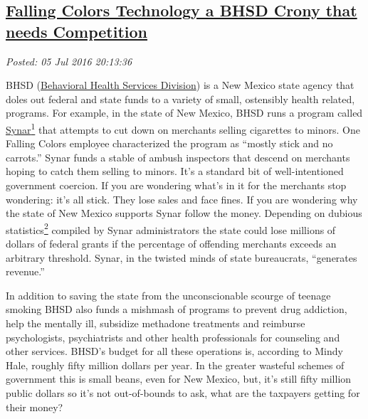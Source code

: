 

\subsection*{\href{http://analyzethedatanotthedrivel.org/2016/07/05/falling-colors-technology-a-bhsd-crony-that-needs-competition/}{Falling Colors Technology a BHSD Crony that needs Competition}}


\noindent\emph{Posted: 05 Jul 2016 20:13:36}
\vspace{6pt}

BHSD
(\href{http://www.hsd.state.nm.us/Behavioral_health_services_division.aspx}{Behavioral
Health Services Division}) is a New Mexico state agency that doles out
federal and state funds to a variety of small, ostensibly health
related, programs. For example, in the state of New Mexico, BHSD runs a
program called
\href{http://www.samhsa.gov/synar/about}{Synar}\protect\hyperlink{fn1}{\textsuperscript{1}}
that attempts to cut down on merchants selling cigarettes to minors. One
Falling Colors employee characterized the program as ``mostly stick and
no carrots.'' Synar funds a stable of ambush inspectors that descend on
merchants hoping to catch them selling to minors. It's a standard bit of
well-intentioned government coercion. If you are wondering what's in it
for the merchants stop wondering: it's all stick. They lose sales and
face fines. If you are wondering why the state of New Mexico supports
Synar follow the money. Depending on dubious
statistics\protect\hyperlink{fn2}{\textsuperscript{2}} compiled by Synar
administrators the state could lose millions of dollars of federal
grants if the percentage of offending merchants exceeds an arbitrary
threshold. Synar, in the twisted minds of state bureaucrats, ``generates
revenue.''

In addition to saving the state from the unconscionable scourge of
teenage smoking BHSD also funds a mishmash of programs to prevent drug
addiction, help the mentally ill, subsidize methadone treatments and
reimburse psychologists, psychiatrists and other health professionals
for counseling and other services. BHSD's budget for all these
operations is, according to Mindy Hale, roughly fifty million dollars
per year. In the greater wasteful schemes of government this is small
beans, even for New Mexico, but, it's still fifty million public dollars
so it's not out-of-bounds to ask, what are the taxpayers getting for
their money?

